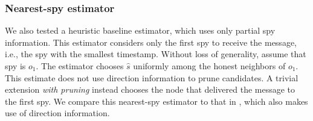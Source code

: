 \subsubsection{Nearest-spy estimator}
We also tested a heuristic baseline estimator, which uses only partial spy information. This estimator considers only the first spy to receive the message, i.e., the spy with the smallest timestamp. Without loss of generality, assume that spy is $o_1$. The estimator chooses $\hat s$ uniformly among the honest neighbors of $o_1$. This estimate does not use direction information to prune candidates. A trivial extension \emph{with pruning} instead chooses the node that delivered the message to the first spy. We compare this nearest-spy estimator to that in \cite{pinto}, which also makes use of direction information. 